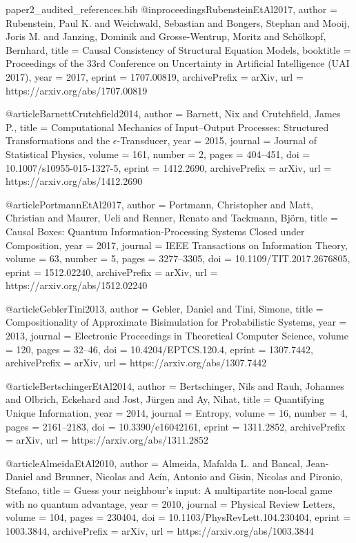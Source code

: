\begin{filecontents*}[overwrite]{paper2_audited_references.bib}
@inproceedings{RubensteinEtAl2017,
  author = {Rubenstein, Paul K. and Weichwald, Sebastian and Bongers, Stephan and Mooij, Joris M. and Janzing, Dominik and Grosse-Wentrup, Moritz and Sch{\"o}lkopf, Bernhard},
  title = {Causal Consistency of Structural Equation Models},
  booktitle = {Proceedings of the 33rd Conference on Uncertainty in Artificial Intelligence (UAI 2017)},
  year = {2017},
  eprint = {1707.00819},
  archivePrefix = {arXiv},
  url = {https://arxiv.org/abs/1707.00819}
}

@article{BarnettCrutchfield2014,
  author = {Barnett, Nix and Crutchfield, James P.},
  title = {Computational Mechanics of Input--Output Processes: Structured Transformations and the $\epsilon$-Transducer},
  year = {2015},
  journal = {Journal of Statistical Physics},
  volume = {161},
  number = {2},
  pages = {404--451},
  doi = {10.1007/s10955-015-1327-5},
  eprint = {1412.2690},
  archivePrefix = {arXiv},
  url = {https://arxiv.org/abs/1412.2690}
}

@article{PortmannEtAl2017,
  author = {Portmann, Christopher and Matt, Christian and Maurer, Ueli and Renner, Renato and Tackmann, Bj{\"o}rn},
  title = {Causal Boxes: Quantum Information-Processing Systems Closed under Composition},
  year = {2017},
  journal = {IEEE Transactions on Information Theory},
  volume = {63},
  number = {5},
  pages = {3277--3305},
  doi = {10.1109/TIT.2017.2676805},
  eprint = {1512.02240},
  archivePrefix = {arXiv},
  url = {https://arxiv.org/abs/1512.02240}
}

@article{GeblerTini2013,
  author = {Gebler, Daniel and Tini, Simone},
  title = {Compositionality of Approximate Bisimulation for Probabilistic Systems},
  year = {2013},
  journal = {Electronic Proceedings in Theoretical Computer Science},
  volume = {120},
  pages = {32--46},
  doi = {10.4204/EPTCS.120.4},
  eprint = {1307.7442},
  archivePrefix = {arXiv},
  url = {https://arxiv.org/abs/1307.7442}
}

@article{BertschingerEtAl2014,
  author = {Bertschinger, Nils and Rauh, Johannes and Olbrich, Eckehard and Jost, J{\"u}rgen and Ay, Nihat},
  title = {Quantifying Unique Information},
  year = {2014},
  journal = {Entropy},
  volume = {16},
  number = {4},
  pages = {2161--2183},
  doi = {10.3390/e16042161},
  eprint = {1311.2852},
  archivePrefix = {arXiv},
  url = {https://arxiv.org/abs/1311.2852}
}

@article{AlmeidaEtAl2010,
  author = {Almeida, Mafalda L. and Bancal, Jean-Daniel and Brunner, Nicolas and Acín, Antonio and Gisin, Nicolas and Pironio, Stefano},
  title = {Guess your neighbour's input: A multipartite non-local game with no quantum advantage},
  year = {2010},
  journal = {Physical Review Letters},
  volume = {104},
  pages = {230404},
  doi = {10.1103/PhysRevLett.104.230404},
  eprint = {1003.3844},
  archivePrefix = {arXiv},
  url = {https://arxiv.org/abs/1003.3844}
}


\end{filecontents*}
